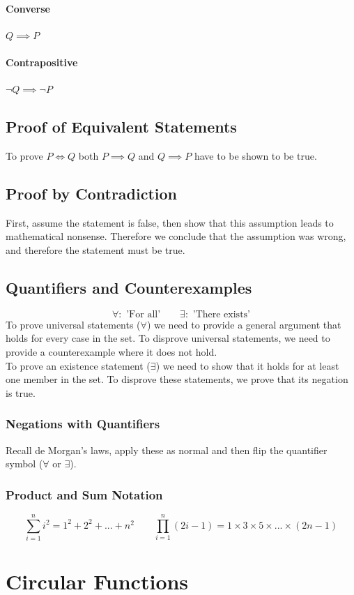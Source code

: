 \documentclass[a4paper,twoside]{article}
\begin{document}
			\paragraph{Converse} $Q\implies P$
			\paragraph{Contrapositive} $\neg Q\implies\neg P$
		\subsection{Proof of Equivalent Statements}
			To prove $P\iff Q$ both $P\implies Q$ and $Q\implies P$ have to be shown to be true.
		\subsection{Proof by Contradiction}
			First, assume the statement is false, then show that this assumption leads to mathematical nonsense. Therefore we conclude that the assumption was wrong, and therefore the statement must be true.
		\subsection{Quantifiers and Counterexamples}
			\[
				\forall:\text{ 'For all'} \qquad \exists:\text{ 'There exists'}
			\]
			To prove universal statements ($\forall$) we need to provide a general argument that holds for every case in the set. To disprove universal statements, we need to provide a counterexample where it does not hold.\\
			To prove an existence statement ($\exists$) we need to show that it holds for at least one member in the set. To disprove these statements, we prove that its negation is true.
			\subsubsection{Negations with Quantifiers}
				Recall de Morgan's laws, apply these as normal and then flip the quantifier symbol ($\forall$ or $\exists$).
			\subsubsection{Product and Sum Notation}
				\[
					\sum_{i=1}^ni^2=1^2+2^2+...+n^2 \qquad \prod_{i=1}^n(2i-1)=1\times3\times5\times...\times(2n-1)
				\]
	\section{Circular Functions}
\end{document}
